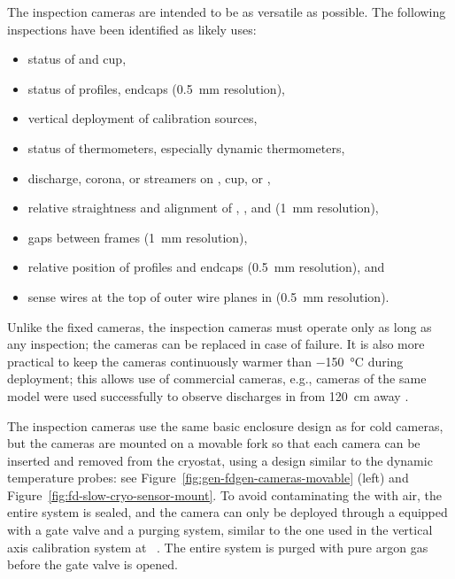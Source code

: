 The inspection cameras are intended to be as versatile as possible.
The following %
inspections have been identified as likely uses:
\begin{itemize}
\item status of  \fdth and cup,
\item status of  profiles, endcaps (\SI{0.5}{mm} resolution),
\item vertical deployment of calibration sources,
\item status of thermometers, especially dynamic thermometers,
\item {} discharge, corona, or streamers on  \fdth, cup, or ,
\item relative straightness and alignment of , , and  (\SI{1}{mm} resolution),
\item gaps between  frames (\SI{1}{mm} resolution),
\item relative position of profiles and endcaps (\SI{0.5}{mm} resolution), and 
\item sense wires at the top of outer wire planes in \single {} (\SI{0.5}{mm} resolution).
\end{itemize}

Unlike the fixed cameras, the inspection cameras must operate only as
long as any inspection; the cameras can be replaced in case of failure.  It
is also more practical to keep the cameras continuously warmer than
 \SI{-150}{\celsius} during deployment; this allows use of  %
commercial cameras, %
e.g., cameras of the same model were used successfully to observe discharges
in  from \SI{120}{cm} away \cite{Auger:2015xlo}.


The inspection cameras use the same basic
enclosure design as for cold cameras, but the cameras are mounted on a movable
fork so that each camera can be inserted and removed from the cryostat,
using a design similar to the dynamic temperature probes: see
 Figure~\ref{fig:gen-fdgen-cameras-movable} (left) and
 Figure~\ref{fig:fd-slow-cryo-sensor-mount}.  To avoid contaminating the
 with air, the entire system is sealed, and the
camera can only be deployed through a \fdth equipped with a gate
valve and a purging system, similar to the one used in the vertical axis
calibration system at \kamland~\cite{Banks:2014hra}. The entire system
is  purged with pure argon gas before the gate valve is opened.

